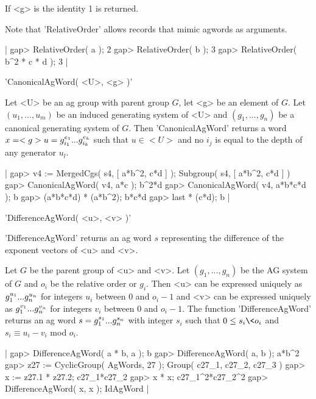If <g> is the identity 1 is returned.

Note that 'RelativeOrder' allows records that mimic agwords as arguments.

|    gap> RelativeOrder( a );
    2
    gap> RelativeOrder( b );
    3
    gap> RelativeOrder( b^2 * c * d );
    3 |


'CanonicalAgWord( <U>, <g> )'

Let <U> be an ag  group with  parent group $G$, let <g> be an element  of
$G$. Let  $(u_1, ..., u_m)$ be  an  induced generating  system of <U> and
$(g_1,  ...,  g_n)$  be  a  canonical  generating  system  of  $G$.  Then
'CanonicalAgWord' returns a word  $x = <g> \* u = g_{i_1}^{e_1} \* ... \*
g_{i_k}^{e_k}$ such that $u\in <U>$ and no $i_j$ is equal to the depth of
any generator $u_l$.

|    gap> v4 := MergedCgs( s4, [ a*b^2, c*d ] );
    Subgroup( s4, [ a*b^2, c*d ] )
    gap> CanonicalAgWord( v4, a*c );
    b^2*d
    gap> CanonicalAgWord( v4, a*b*c*d );
    b
    gap> (a*b*c*d) * (a*b^2);
    b*c*d
    gap> last * (c*d);
    b |


'DifferenceAgWord( <u>, <v> )'

'DifferenceAgWord' returns an ag word  $s$ representing the difference of
the exponent vectors of <u> and <v>.

Let $G$ be the parent group of <u> and <v>.  Let $(g_1, ..., g_n)$ be the
AG system of $G$  and $o_i$ be the relative order or $g_i$.  Then <u> can
be expressed uniquely as $g_1^{u_1}\* ...\* g_n^{u_n}$ for integers $u_i$
between $0$ and $o_i-1$ and <v> can be expressed uniquely as $g_1^{v_1}\*
...\*  g_n^{v_n}$  for integers  $v_i$  between  $0$  and  $o_i-1$.   The
function  'DifferenceAgWord' returns an  ag word $s  = g_1^{s_1}\*  ...\*
g_n^{s_n}$ with integer  $s_i$  such that $0 \leq  s_i \<  o_i$ and  $s_i
\equiv u_i - v_i$ mod $o_i$.

|    gap> DifferenceAgWord( a * b, a );
    b
    gap> DifferenceAgWord( a, b );
    a*b^2 
    gap> z27 := CyclicGroup( AgWords, 27 );
    Group( c27_1, c27_2, c27_3 )
    gap> x := z27.1 * z27.2;
    c27_1*c27_2
    gap> x * x;
    c27_1^2*c27_2^2
    gap> DifferenceAgWord( x, x );
    IdAgWord |


